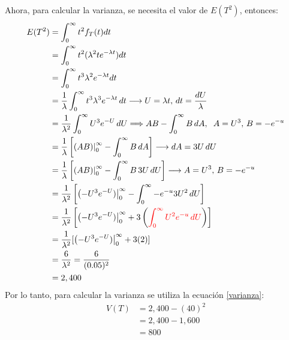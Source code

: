 \documentclass{article}
\begin{document}
Ahora, para calcular la varianza, se necesita el valor de $E(T^2)$, entonces:
\begin{align}
\nonumber
E{(T^2)}    & = \int_{0}^{\infty}t^2f_{T}(t)dt \\ \nonumber
            & = \int_{0}^{\infty}t^2(\lambda^2 te^{- \lambda t})dt \\ \nonumber
            & = \int_{0}^{\infty} t^3 \lambda^2 e^{- \lambda t}dt \\ \nonumber
            & = \frac{1}{\lambda} \int_{0}^{\infty} t^3 \lambda^3 e^{- \lambda t} \, dt \longrightarrow U = \lambda t,  \,  dt = \frac{dU}{\lambda} \\ \nonumber
            & = \frac{1}{\lambda^2} \int_{0}^{\infty} U^3 e^{-U} \, dU \Longrightarrow AB - \int_{0}^{\infty} B \, dA, \hspace{2mm} A=U^3,  \,  B=-e^{-u} \\ \nonumber
            & = \frac{1}{\lambda} \left[\left (AB) \right |_{0}^{\infty} - \int_{0}^{\infty} B \, dA \right] \longrightarrow dA=3U \, dU \\ \nonumber
            & = \frac{1}{\lambda} \left[\left (AB) \right |_{0}^{\infty} - \int_{0}^{\infty} B \, 3U \, dU \right] \longrightarrow A=U^3,  \,  B=-e^{-u} \\ \nonumber
            & = \frac{1}{\lambda^2} \left[ \left (-U^3 e^{-U}) \right |_{0}^{\infty} - \int_{0}^{\infty} -e^{-u} 3U^2 \, dU \right] \\ \nonumber
            & = \frac{1}{\lambda^2} \left[ \left (-U^3 e^{-U}) \right |_{0}^{\infty} + 3 \left( \color{red} \int_{0}^{\infty} U^2 e^{-u} \, dU \color{black} \right) \right] \\ \nonumber
            & = \frac{1}{\lambda^2} [ \left (-U^3 e^{-U}) \right |_{0}^{\infty} + 3(2) ] \\ \nonumber
            & = \frac{6}{\lambda^2} = \frac{6}{(0.05)^2} \\ \nonumber
            & = 2,400
\end{align}
Por lo tanto, para calcular la varianza se utiliza la ecuación \ref{varianza}:
\begin{align}
V{(T)}  & = 2,400 - (40)^2 \\ \nonumber
        & = 2,400 - 1,600 \\ \nonumber
        & = 800 \\ \nonumber
\end{align}




\end{document}
